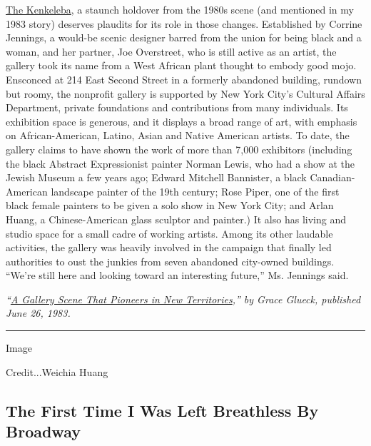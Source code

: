 \href{https://www.facebook.com/kenkeleba.house}{The Kenkeleba}, a
staunch holdover from the 1980s scene (and mentioned in my 1983 story)
deserves plaudits for its role in those changes. Established by Corrine
Jennings, a would-be scenic designer barred from the union for being
black and a woman, and her partner, Joe Overstreet, who is still active
as an artist, the gallery took its name from a West African plant
thought to embody good mojo. Ensconced at 214 East Second Street in a
formerly abandoned building, rundown but roomy, the nonprofit gallery is
supported by New York City's Cultural Affairs Department, private
foundations and contributions from many individuals. Its exhibition
space is generous, and it displays a broad range of art, with emphasis
on African-American, Latino, Asian and Native American artists. To date,
the gallery claims to have shown the work of more than 7,000 exhibitors
(including the black Abstract Expressionist painter Norman Lewis, who
had a show at the Jewish Museum a few years ago; Edward Mitchell
Bannister, a black Canadian-American landscape painter of the 19th
century; Rose Piper, one of the first black female painters to be given
a solo show in New York City; and Arlan Huang, a Chinese-American glass
sculptor and painter.) It also has living and studio space for a small
cadre of working artists. Among its other laudable activities, the
gallery was heavily involved in the campaign that finally led
authorities to oust the junkies from seven abandoned city-owned
buildings. ``We're still here and looking toward an interesting
future,'' Ms. Jennings said.

\emph{``\href{https://www.nytimes.com/1983/06/26/arts/gallery-view-a-gallery-scene-that-pioneers-in-new-territories.html}{A
Gallery Scene That Pioneers in New Territories},'' by Grace Glueck,
published June 26, 1983.}

\begin{center}\rule{0.5\linewidth}{\linethickness}\end{center}

Image

Credit...Weichia Huang

\hypertarget{the-first-time-i-was-left-breathless-by-broadway}{%
\subsection{The First Time I Was Left Breathless By
Broadway}\label{the-first-time-i-was-left-breathless-by-broadway}}

